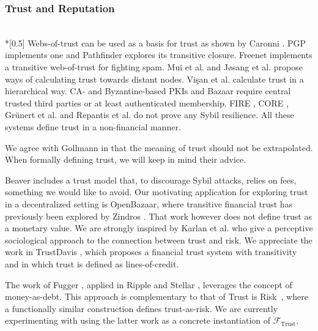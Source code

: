 \subsubsection{Trust and Reputation} \ \\*[0.5\baselineskip]
  Webs-of-trust can be used as a basis for trust as shown by Caronni \cite{wot}. PGP
  \cite{pgp} implements one and Pathfinder \cite{pathfinder} explores its transitive
  closure. Freenet \cite{freenet} implements a transitive web-of-trust for fighting spam.
  Mui et al. \cite{mui} and J\o{}sang et al. \cite{beta} propose ways of calculating trust
  towards distant nodes.  Vi\c{s}an et al. \cite{vpc} calculate trust in a hierarchical
  way. CA- and Byzantine-based \cite{byzantine} PKIs \cite{pki} and Bazaar \cite{bazaar}
  require central trusted third parties or at least authenticated membership. FIRE
  \cite{fire}, CORE \cite{core}, Gr\"unert et al. \cite{ghkkw} and Repantis et al.
  \cite{rk} do not prove any Sybil resilience. All these systems define trust in a
  non-financial manner.

  We agree with Gollmann \cite{badtrust} in that the meaning of trust should not be
  extrapolated. When formally defining trust, we will keep in mind their advice.

  Beaver \cite{beaver} includes a trust model that, to discourage Sybil attacks, relies on
  fees, something we would like to avoid. Our motivating application for exploring trust
  in a decentralized setting is OpenBazaar, where transitive financial trust has
  previously been explored by Zindros \cite{dionyziz}. That work however does not define
  trust as a monetary value. We are strongly inspired by Karlan et al. \cite{kmrs} who
  give a perceptive sociological approach to the connection between trust and risk. We
  appreciate the work in TrustDavis \cite{davis}, which proposes a financial trust system
  with transitivity and in which trust is defined as lines-of-credit.

  The work of Fugger \cite{iou}, applied in Ripple \cite{ripple} and Stellar
  \cite{stellar}, leverages the concept of money-as-debt. This approach is complementary
  to that of Trust is Risk~\cite{trustisrisk}, where a functionally similar construction
  defines trust-as-risk. We are currently experimenting with using the latter work as a
  concrete instantiation of $\mathcal{F}_{\mathrm{Trust}}$.
